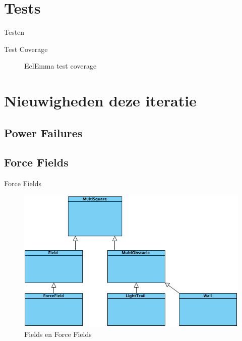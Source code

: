 \documentclass[t]{beamer}
\begin{document}
\section{Tests}

\begin{frame}{Testen}
\begin{multicols}{2}
\tableofcontents[currentsection]
\end{multicols}
\end{frame}

\begin{frame}{Test Coverage}
\begin{figure}[h!]
	\center
	\caption{EclEmma test coverage}
\end{figure}
\end{frame}

\section{Nieuwigheden deze iteratie}

\subsection{Power Failures}

\subsection{Force Fields}
\begin{frame}{Force Fields}
\begin{figure}
	\center
	\includegraphics[width= 0.7\linewidth]{img/forcefield.png}
	\caption{Fields en Force Fields}
\end{figure}
\end{frame}
\end{document}
